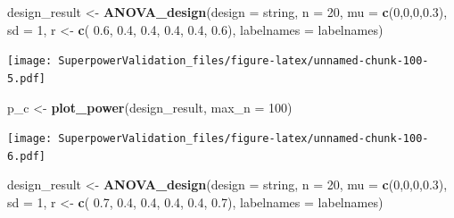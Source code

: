 \documentclass[]{book}
\newenvironment{Shaded}{\begin{snugshade}}{\end{snugshade}}
\newcommand{\DataTypeTok}[1]{\textcolor[rgb]{0.13,0.29,0.53}{#1}}
\newcommand{\DecValTok}[1]{\textcolor[rgb]{0.00,0.00,0.81}{#1}}
\newcommand{\FloatTok}[1]{\textcolor[rgb]{0.00,0.00,0.81}{#1}}
\newcommand{\KeywordTok}[1]{\textcolor[rgb]{0.13,0.29,0.53}{\textbf{#1}}}
\newcommand{\NormalTok}[1]{#1}
\newcommand{\StringTok}[1]{\textcolor[rgb]{0.31,0.60,0.02}{#1}}
\begin{document}
\begin{Shaded}
\begin{Highlighting}[]
\NormalTok{design_result <-}\StringTok{ }\KeywordTok{ANOVA_design}\NormalTok{(}\DataTypeTok{design =}\NormalTok{ string,}
                              \DataTypeTok{n =} \DecValTok{20}\NormalTok{, }
                              \DataTypeTok{mu =} \KeywordTok{c}\NormalTok{(}\DecValTok{0}\NormalTok{,}\DecValTok{0}\NormalTok{,}\DecValTok{0}\NormalTok{,}\FloatTok{0.3}\NormalTok{), }
                              \DataTypeTok{sd =} \DecValTok{1}\NormalTok{, }
\NormalTok{                              r <-}\StringTok{ }\KeywordTok{c}\NormalTok{(}
                                \FloatTok{0.6}\NormalTok{, }\FloatTok{0.4}\NormalTok{, }\FloatTok{0.4}\NormalTok{,}
                                \FloatTok{0.4}\NormalTok{, }\FloatTok{0.4}\NormalTok{,}
                                \FloatTok{0.6}\NormalTok{),}
                              \DataTypeTok{labelnames =}\NormalTok{ labelnames)}
\end{Highlighting}
\end{Shaded}

\texttt{[image: SuperpowerValidation\_files/figure-latex/unnamed-chunk-100-5.pdf]}

\begin{Shaded}
\begin{Highlighting}[]
\NormalTok{p_c <-}\StringTok{ }\KeywordTok{plot_power}\NormalTok{(design_result,}
                      \DataTypeTok{max_n =} \DecValTok{100}\NormalTok{)}
\end{Highlighting}
\end{Shaded}

\texttt{[image: SuperpowerValidation\_files/figure-latex/unnamed-chunk-100-6.pdf]}

\begin{Shaded}
\begin{Highlighting}[]
\NormalTok{design_result <-}\StringTok{ }\KeywordTok{ANOVA_design}\NormalTok{(}\DataTypeTok{design =}\NormalTok{ string,}
                              \DataTypeTok{n =} \DecValTok{20}\NormalTok{, }
                              \DataTypeTok{mu =} \KeywordTok{c}\NormalTok{(}\DecValTok{0}\NormalTok{,}\DecValTok{0}\NormalTok{,}\DecValTok{0}\NormalTok{,}\FloatTok{0.3}\NormalTok{), }
                              \DataTypeTok{sd =} \DecValTok{1}\NormalTok{, }
\NormalTok{                              r <-}\StringTok{ }\KeywordTok{c}\NormalTok{(}
                                \FloatTok{0.7}\NormalTok{, }\FloatTok{0.4}\NormalTok{, }\FloatTok{0.4}\NormalTok{,}
                                \FloatTok{0.4}\NormalTok{, }\FloatTok{0.4}\NormalTok{,}
                                \FloatTok{0.7}\NormalTok{), }
                              \DataTypeTok{labelnames =}\NormalTok{ labelnames)}
\end{Highlighting}
\end{Shaded}
\end{document}
